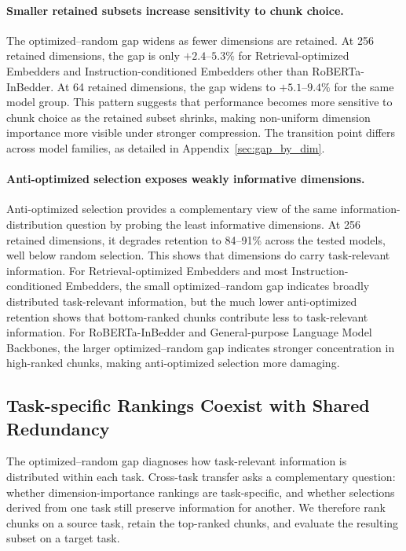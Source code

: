 \documentclass[11pt]{article}
\begin{document}
\paragraph{Smaller retained subsets increase sensitivity to chunk choice.}
The optimized--random gap widens as fewer dimensions are retained. At 256 retained dimensions, the gap is only $+2.4$--$5.3\%$ for Retrieval-optimized Embedders and Instruction-conditioned Embedders other than RoBERTa-InBedder. At 64 retained dimensions, the gap widens to $+5.1$--$9.4\%$ for the same model group. This pattern suggests that performance becomes more sensitive to chunk choice as the retained subset shrinks, making non-uniform dimension importance more visible under stronger compression. The transition point differs across model families, as detailed in Appendix~\ref{sec:gap_by_dim}.

\paragraph{Anti-optimized selection exposes weakly informative dimensions.}
Anti-optimized selection provides a complementary view of the same information-distribution question by probing the least informative dimensions. At 256 retained dimensions, it degrades retention to 84--91\% across the tested models, well below random selection. This shows that dimensions do carry task-relevant information. For Retrieval-optimized Embedders and most Instruction-conditioned Embedders, the small optimized--random gap indicates broadly distributed task-relevant information, but the much lower anti-optimized retention shows that bottom-ranked chunks contribute less to task-relevant information. For RoBERTa-InBedder and General-purpose Language Model Backbones, the larger optimized--random gap indicates stronger concentration in high-ranked chunks, making anti-optimized selection more damaging.


\subsection{Task-specific Rankings Coexist with Shared Redundancy}
\label{sec:cross_task_transfer}
The optimized--random gap diagnoses how task-relevant information is distributed within each task. Cross-task transfer asks a complementary question: whether dimension-importance rankings are task-specific, and whether selections derived from one task still preserve information for another. We therefore rank chunks on a source task, retain the top-ranked chunks, and evaluate the resulting subset on a target task. 
\end{document}
